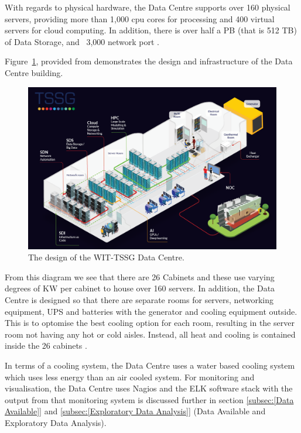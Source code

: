 \documentclass[12pt]{scrartcl}
\begin{document}
With regards to physical hardware, the Data Centre supports over 160 physical servers, providing more than 1,000 cpu cores for processing and 400 virtual servers for cloud computing.  In addition, there is over half a PB (that is 512 TB) of Data Storage, and ~3,000 network port \citep{TSSG}. 

Figure~\ref{fig:TSSGdataCentreDesign}, provided from \citet{TSSG} demonstrates the design and infrastructure of the Data Centre building.  

\begin{figure}[h]
  \caption{The design of the WIT-TSSG Data Centre.}
  \label{fig:TSSGdataCentreDesign}
  \centering
    \includegraphics[scale=0.35]{TSSG_Diagram.png}
\end{figure}

From this diagram we see that there are 26 Cabinets and these use varying degrees of KW per cabinet to house over 160 servers. In addition, the Data Centre is designed so that there are separate rooms for servers, networking equipment, UPS and batteries with the generator and cooling equipment outside. This is to optomise the best cooling option for each room, resulting in the server room not having any hot or cold aisles. Instead, all heat and cooling is contained inside the 26 cabinets \citep{TSSG}.

In terms of a cooling system, the Data Centre uses a water based cooling system which uses less energy than an air cooled system. For monitoring and visualisation, the Data Centre uses Nagios and the ELK software stack \citep{ELK} with the output from that monitoring system is discussed further in section \ref{subsec:[Data Available]} and \ref{subsec:[Exploratory Data Analysis]} (Data Available and Exploratory Data Analysis). 
\end{document}
